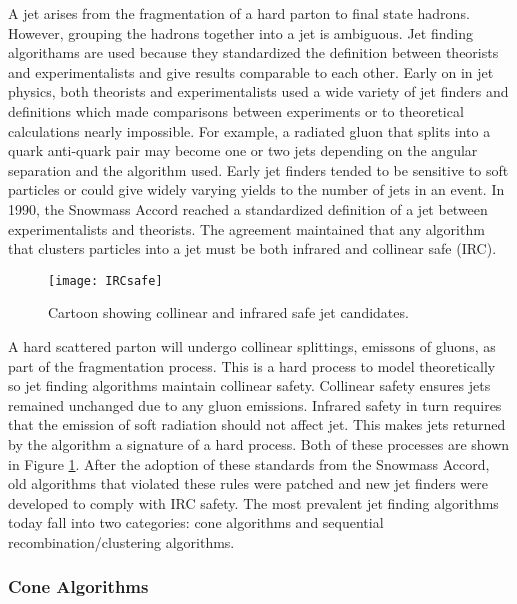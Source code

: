A jet arises from the fragmentation of a hard parton to final state hadrons.  However, grouping the hadrons together into a jet is ambiguous.  Jet finding algorithams are used because they standardized the definition between theorists and experimentalists and give results comparable to each other. Early on in jet physics, both theorists and experimentalists used a wide variety of jet finders and definitions which made comparisons between experiments or to theoretical calculations nearly impossible\cite{Atkin:2015msa}.  For example, a radiated gluon that splits into a quark anti-quark pair may become one or two jets depending on the angular separation and the algorithm used.  Early jet finders tended to be sensitive to soft particles or could give widely varying yields to the number of jets in an event.  In 1990, the Snowmass Accord\cite{Huth:217490} reached a standardized definition of a jet between experimentalists and theorists.  The agreement maintained that any algorithm that clusters particles into a jet must be both infrared and collinear safe (IRC).  

\begin{figure}[h]
\texttt{[image: IRCsafe]}
\centering
\caption{Cartoon showing collinear and infrared safe jet candidates\cite{Blazey:2000qt}.}
\label{fig:IRCsafe}
\end{figure}

A hard scattered parton will undergo collinear splittings, emissons of gluons, as part of the fragmentation process.  This is a hard process to model theoretically so jet finding algorithms maintain collinear safety.
Collinear safety ensures jets remained unchanged due to any gluon emissions.  Infrared safety in turn requires that the emission of soft radiation should not affect jet.  This makes jets returned by the algorithm  a signature of a hard process.  Both of these processes are shown in Figure \ref{fig:IRCsafe}. After the adoption of these standards from the Snowmass Accord, old algorithms that violated these rules were patched and new jet finders were developed to comply with IRC safety.  The most prevalent jet finding algorithms today fall into two categories: cone algorithms and sequential recombination/clustering algorithms.

\subsubsection{Cone Algorithms}

